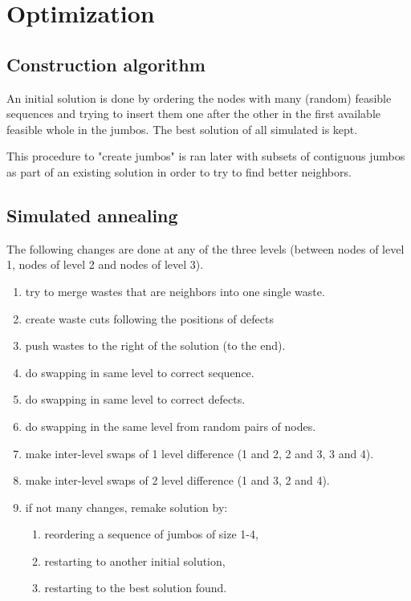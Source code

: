 \documentclass{roadef}
\begin{document}


\section{Optimization}

    \subsection{Construction algorithm}

        An initial solution is done by ordering the nodes with many (random) feasible sequences and trying to insert them one after the other in the first available feasible whole in the jumbos. The best solution of all simulated is kept.

        This procedure to "create jumbos" is ran later with subsets of contiguous jumbos as part of an existing solution in order to try to find better neighbors.

    \subsection{Simulated annealing}

        The following changes are done at any of the three levels (between nodes of level 1, nodes of level 2 and nodes of level 3).

        \begin{enumerate}

            \item try to merge wastes that are neighbors into one single waste.
            \item create waste cuts following the positions of defects
            \item push wastes to the right of the solution (to the end).
            \item do swapping in same level to correct sequence.
            \item do swapping in same level to correct defects.
            \item do swapping in the same level from random pairs of nodes.
            \item make inter-level swaps of 1 level difference (1 and 2, 2 and 3, 3 and 4).
            \item make inter-level swaps of 2 level difference (1 and 3, 2 and 4).
            \item if not many changes, remake solution by:

            \begin{enumerate}
                \item reordering a sequence of jumbos of size 1-4, 
                \item restarting to another initial solution,
                \item restarting to the best solution found.
            \end{enumerate}

        \end{enumerate}
\end{document}
